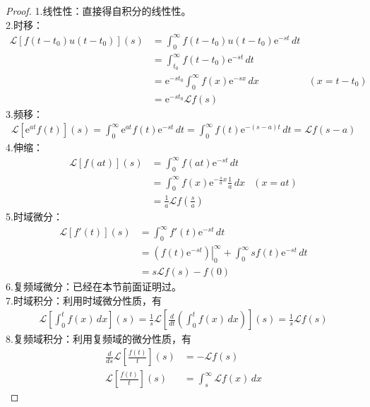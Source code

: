 \documentclass{ctexbook}
\newcommand{\evalat}[3]{\left.#1\right|_{#2}^{#3}}
\begin{document}
\begin{proof}
    1.线性性：直接得自积分的线性性。\\
    2.时移：\begin{align*}
        \mathcal{L} [f(t-t_0)u(t-t_0)](s)&=\int_0^{\infty}f(t-t_0)u(t-t_0)\mathrm{e}^{-st}\,dt\\
        &=\int_{t_0}^{\infty}f(t-t_0)\mathrm{e}^{-st}\,dt\\
        &=\mathrm{e}^{-s t_0}\int_0^{\infty}f(x)\mathrm{e}^{-s x}\,dx&( x=t-t_0)\\
        &=\mathrm{e}^{-s t_0}\mathcal{L} f(s)
    \end{align*}
    3.频移：\begin{align*}
        \mathcal{L} [\mathrm{e}^{a t}f(t)](s)=\int_0^{\infty}\mathrm{e}^{a t}f(t)\mathrm{e}^{-st}\,dt=\int_0^{\infty}f(t)\mathrm{e}^{-(s-a)t}\,dt=\mathcal{L} f(s-a)
    \end{align*}
    4.伸缩：\begin{align*}
        \mathcal{L} [f(at)](s)&=\int_0^{\infty}f(at)\mathrm{e}^{-st}\,dt\\
        &=\int_0^{\infty}f(x)\mathrm{e}^{-\frac{s}{a}x}\frac{1}{a}\,dx&(x=at)\\
        &=\frac{1}{a}\mathcal{L} f\left(\frac{s}{a}\right)
    \end{align*}
    5.时域微分：\begin{align*}
        \mathcal{L} [f'(t)](s)&=\int_0^{\infty}f'(t)\mathrm{e}^{-st}\,dt\\
        &=\evalat{\left(f(t)\mathrm{e}^{-st}\right)}{0}{\infty}+\int_0^{\infty}sf(t)\mathrm{e}^{-st}\,dt\\
        &=s\mathcal{L} f(s)-f(0)
    \end{align*}
    6.复频域微分：已经在本节前面证明过。\\
    7.时域积分：利用时域微分性质，有
    \begin{align*}
        \mathcal{L} \left[\int_0^t f(x)\,dx\right](s)=\frac{1}{s}\mathcal{L} \left[\frac{d}{dt}\left(\int_0^t f(x)\,dx\right)\right](s)=\frac{1}{s}\mathcal{L} f(s)
    \end{align*}
    8.复频域积分：利用复频域的微分性质，有
    \begin{align*}
        \frac{d}{ds}\mathcal{L} \left[\frac{f(t)}{t}\right](s)&=-\mathcal{L} f(s)\\
        \mathcal{L} \left[\frac{f(t)}{t}\right](s)&=\int_s^{\infty}\mathcal{L}f(x)\,dx
    \end{align*}
\end{proof}
\end{document}
